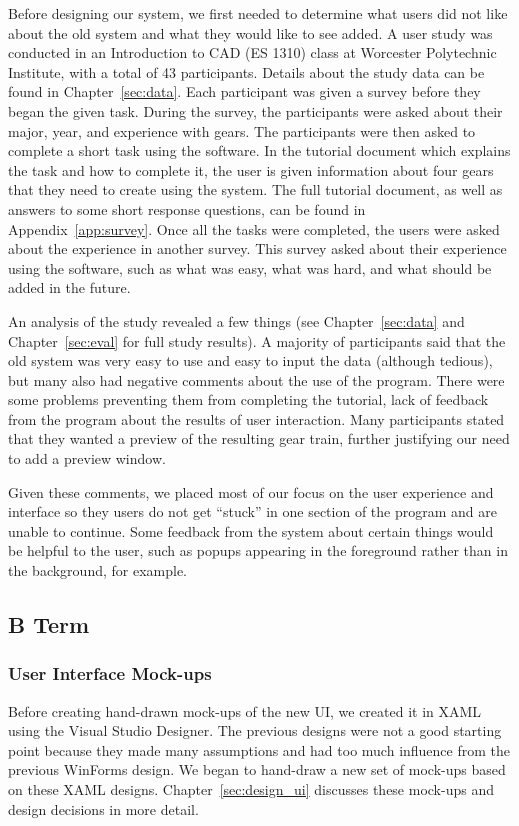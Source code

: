 \begin{doublespace}
Before designing our system, we first needed to determine what users did not like about the old system and what they would like to see added. A user study was conducted in an Introduction to CAD (ES 1310) class at Worcester Polytechnic Institute, with a total of 43 participants. Details about the study data can be found in Chapter~\ref{sec:data}. Each participant was given a survey before they began the given task. During the survey, the participants were asked about their major, year, and experience with gears. The participants were then asked to complete a short task using the software. In the tutorial document which explains the task and how to complete it, the user is given information about four gears that they need to create using the system. The full tutorial document, as well as answers to some short response questions, can be found in Appendix~\ref{app:survey}. Once all the tasks were completed, the users were asked about the experience in another survey. This survey asked about their experience using the software, such as what was easy, what was hard, and what should be added in the future. 

An analysis of the study revealed a few things (see Chapter~\ref{sec:data} and Chapter~\ref{sec:eval} for full study results). A majority of participants said that the old system was very easy to use and easy to input the data (although tedious), but many also had negative comments about the use of the program. There were some problems preventing them from completing the tutorial, lack of feedback from the program about the results of user interaction. Many participants stated that they wanted a preview of the resulting gear train, further justifying our need to add a preview window.

Given these comments, we placed most of our focus on the user experience and interface so they users do not get ``stuck'' in one section of the program and are unable to continue. Some feedback from the system about certain things would be helpful to the user, such as popups appearing in the foreground rather than in the background, for example.

\subsection{B Term}

\subsubsection{User Interface Mock-ups}
Before creating hand-drawn mock-ups of the new UI, we created it in XAML using the Visual Studio Designer. The previous designs were not a good starting point because they made many assumptions and had too much influence from the previous WinForms design. We began to hand-draw a new set of mock-ups based on these XAML designs. Chapter~\ref{sec:design_ui} discusses these mock-ups and design decisions in more detail.


\end{doublespace}
